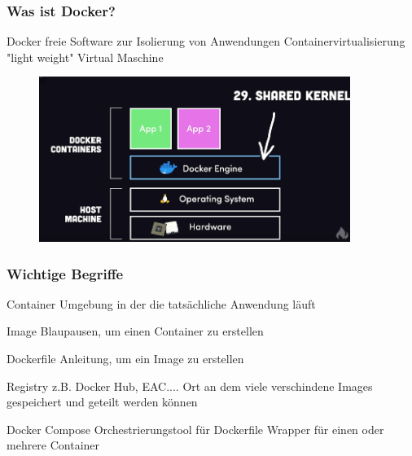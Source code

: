 \documentclass[22pt]{beamer}
\begin{document}
\begin{frame}[t]
    \frametitle{Was ist Docker?}
    \begin{block}{Docker}
        freie Software zur Isolierung von Anwendungen\newline
        Containervirtualisierung\newline
        "light weight" Virtual Maschine\newline
    \end{block}
    \begin{figure}[h]
        \centering
        \includegraphics[width=0.9\textwidth]{Bilder/Docker Concept.png}
    \end{figure}
\end{frame}


\begin{frame}[t]
    \frametitle{Wichtige Begriffe}
    
    \begin{block}{Container}
        Umgebung in der die tatsächliche Anwendung läuft
    \end{block} 
    \begin{block}{Image}
        Blaupausen, um einen Container zu erstellen
    \end{block}
    \begin{block}{Dockerfile}
        Anleitung, um ein Image zu erstellen
    \end{block}\pause
    \begin{block}{Registry}
        z.B. Docker Hub, EAC....
        Ort an dem viele verschindene Images gespeichert und geteilt werden können
    \end{block}
    \begin{block}{Docker Compose}
        Orchestrierungstool für Dockerfile\newline
        Wrapper für einen oder mehrere Container
    \end{block}
\end{frame}
\end{document}
